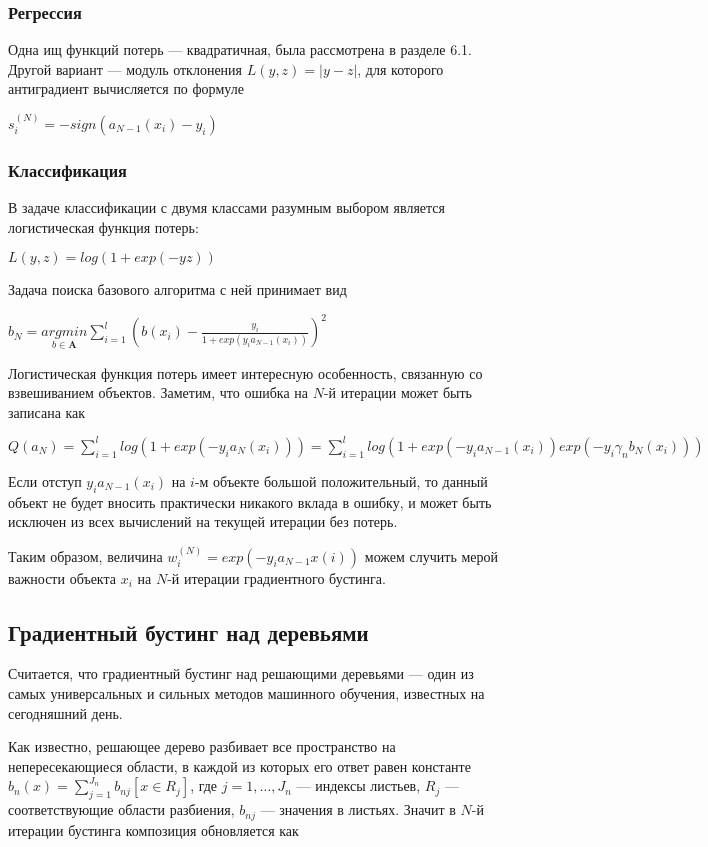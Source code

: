\documentclass{article}
\theoremstyle{definition}
\theoremstyle{theorem}
\theoremstyle{remark}
\theoremstyle{theorem}
\theoremstyle{example}
\theoremstyle{theorem}
\theoremstyle{theorem}
\theoremstyle{theorem}
\theoremstyle{theorem}
\begin{document}
\subsubsection{Регрессия}

Одна ищ функций потерь --- квадратичная, была рассмотрена в разделе 6.1. Другой вариант --- модуль отклонения $L(y,z) = |y-z|$, для которого антиградиент вычисляется по формуле 

$s_i^{(N)} = -sign(a_{N-1}(x_i)-y_i)$

\subsubsection{Классификация}

В задаче классификации с двумя классами разумным выбором является логистическая функция потерь:

$L(y,z) = log(1+exp(-yz))$

Задача поиска базового алгоритма с ней принимает вид

$b_N = \underset{b\in\mathbf{A}}{argmin}\sum_{i=1}^{l} (b(x_i) - \frac{y_i}{1+exp(y_ia_{N-1}(x_i))})^2$

Логистическая функция потерь имеет интересную особенность, связанную со взвешиванием объектов. Заметим, что ошибка на $N$-й итерации может быть записана как

$Q(a_N) = \sum_{i=1}^{l}log(1+exp(-y_ia_N(x_i))) = \sum_{i=1}^{l}log(1+exp(-y_ia_{N-1}(x_i))exp(-y_i \gamma_n b_N(x_i)))$

Если отступ $y_ia_{N-1}(x_i)$ на $i$-м объекте большой положительный, то данный объект не будет вносить практически никакого вклада в ошибку, и может быть исключен из всех вычислений на текущей итерации без потерь.

Таким образом, величина $w_i^{(N)} = exp(-y_ia_{N-1}x(i))$ можем случить мерой важности объекта $x_i$ на $N$-й итерации градиентного бустинга.


\subsection{Градиентный бустинг над деревьями}

Считается, что градиентный бустинг над решающими деревьями --- один из самых универсальных и сильных методов машинного обучения, известных на сегодняшний день.

Как известно, решающее дерево разбивает все пространство на непересекающиеся области, в каждой из которых его ответ равен константе $b_n(x) = \sum_{j=1}^{J_n} b_{nj}[x\in R_j]$, где $j=1,\ldots,J_n$ --- индексы листьев, $R_{j}$ --- соответствующие области разбиения, $b_{nj}$ --- значения в листьях. Значит в $N$-й итерации бустинга композиция обновляется как
\end{document}
